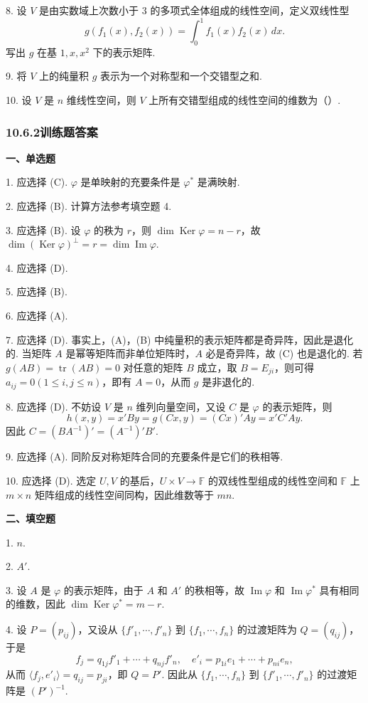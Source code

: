 \documentclass[UTF8, 12pt, fontset=fandol, oneside]{ctexart}
\begin{document}
8. 设 $V$ 是由实数域上次数小于 $3$ 的多项式全体组成的线性空间，定义双线性型
\[
g(f_1(x),f_2(x))=\int_0^1 f_1(x)f_2(x)\,dx.
\]
写出 $g$ 在基 $1,x,x^2$ 下的表示矩阵.

9. 将 $V$ 上的纯量积 $g$ 表示为一个对称型和一个交错型之和.

10. 设 $V$ 是 $n$ 维线性空间，则 $V$ 上所有交错型组成的线性空间的维数为（\quad ）.

\subsubsection*{10.6.2\quad 训练题答案}

\noindent\textbf{一、单选题}

1. 应选择 (C). $\varphi$ 是单映射的充要条件是 $\varphi^*$ 是满映射.

2. 应选择 (B). 计算方法参考填空题 4.

3. 应选择 (B). 设 $\varphi$ 的秩为 $r$，则 $\dim\operatorname{Ker}\varphi=n-r$，故 $\dim(\operatorname{Ker}\varphi)^\perp=r=\dim\operatorname{Im}\varphi$.

4. 应选择 (D).

5. 应选择 (B).

6. 应选择 (A).

7. 应选择 (D). 事实上，(A)，(B) 中纯量积的表示矩阵都是奇异阵，因此是退化的. 当矩阵 $A$ 是幂等矩阵而非单位矩阵时，$A$ 必是奇异阵，故 (C) 也是退化的. 若 $g(AB)=\operatorname{tr}(AB)=0$ 对任意的矩阵 $B$ 成立，取 $B=E_{ji}$，则可得 $a_{ij}=0(1\le i,j\le n)$，即有 $A=0$，从而 $g$ 是非退化的.

8. 应选择 (D). 不妨设 $V$ 是 $n$ 维列向量空间，又设 $C$ 是 $\varphi$ 的表示矩阵，则
\[
h(x,y)=x'By=g(Cx,y)=(Cx)'Ay=x'C'Ay.
\]
因此 $C=(BA^{-1})'=(A^{-1})'B'$.

9. 应选择 (A). 同阶反对称矩阵合同的充要条件是它们的秩相等.

10. 应选择 (D). 选定 $U,V$ 的基后，$U\times V\to\mathbb{F}$ 的双线性型组成的线性空间和 $\mathbb{F}$ 上 $m\times n$ 矩阵组成的线性空间同构，因此维数等于 $mn$.

\noindent\textbf{二、填空题}

1. $n$.

2. $A'$.

3. 设 $A$ 是 $\varphi$ 的表示矩阵，由于 $A$ 和 $A'$ 的秩相等，故 $\operatorname{Im}\varphi$ 和 $\operatorname{Im}\varphi^*$ 具有相同的维数，因此 $\dim\operatorname{Ker}\varphi^*=m-r$.

4. 设 $P=(p_{ij})$，又设从 $\{f'_1,\cdots,f'_n\}$ 到 $\{f_1,\cdots,f_n\}$ 的过渡矩阵为 $Q=(q_{ij})$，于是
\[
f_j=q_{1j}f'_1+\cdots+q_{nj}f'_n,\quad
e'_i=p_{1i}e_1+\cdots+p_{ni}e_n,
\]
从而 $\langle f_j,e'_i\rangle=q_{ij}=p_{ji}$，即 $Q=P'$. 因此从 $\{f_1,\cdots,f_n\}$ 到 $\{f'_1,\cdots,f'_n\}$ 的过渡矩阵是 $(P')^{-1}$.
\end{document}

